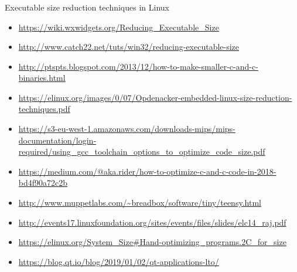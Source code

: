 \documentclass{beamer}
\begin{document}
\begin{frame}
\frametitle{\secname}
\tiny

Executable size reduction techniques in Linux

\begin{itemize}
\item \url{https://wiki.wxwidgets.org/Reducing_Executable_Size}
\item \url{http://www.catch22.net/tuts/win32/reducing-executable-size}
\item \url{http://ptspts.blogspot.com/2013/12/how-to-make-smaller-c-and-c-binaries.html}
\item \url{https://elinux.org/images/0/07/Opdenacker-embedded-linux-size-reduction-techniques.pdf}
\item \url{https://s3-eu-west-1.amazonaws.com/downloads-mips/mips-documentation/login-required/using_gcc_toolchain_options_to_optimize_code_size.pdf}
\item \url{https://medium.com/@aka.rider/how-to-optimize-c-and-c-code-in-2018-bd4f90a72c2b}
\item \url{http://www.muppetlabs.com/~breadbox/software/tiny/teensy.html}
\item \url{http://events17.linuxfoundation.org/sites/events/files/slides/elc14_raj.pdf}
\item \url{https://elinux.org/System_Size\#Hand-optimizing_programs.2C_for_size}
\item \url{https://blog.qt.io/blog/2019/01/02/qt-applications-lto/}
\end{itemize}
\end{frame}
\end{document}
